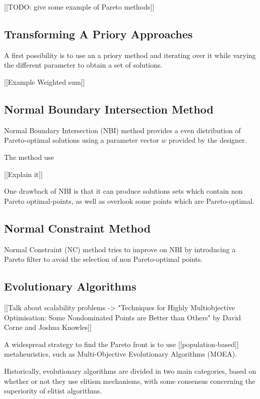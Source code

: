 [[TODO: give some example of Pareto methods]]

\subsection{Transforming A Priory Approaches}

A first possibility is to use an a priory method and iterating over it while varying the different parameter to obtain a set of solutions.

[[Example Weighted sum]]

\subsection{Normal Boundary Intersection Method}

Normal Boundary Intersection (NBI)\cite{S1052623496307510} method provides a even distribution of Pareto-optimal solutions using a parameter vector $w$ provided by the designer.

The method use 

[[Explain it]]

One drawback of NBI is that it can produce solutions sets which contain non Pareto optimal-points, as well as overlook some points which are Pareto-optimal.

\subsection{Normal Constraint Method}

Normal Constraint (NC) method tries to improve on NBI by introducing a Pareto filter to avoid the selection of non Pareto-optimal points.

\subsection{Evolutionary Algorithms}

[[Talk about scalability problems -> "Techniques for Highly Multiobjective Optimisation: Some Nondominated Points are Better than Others" by David Corne and Joshua Knowles]]


A widespread strategy to find the Pareto front is to use [[population-based]] metaheuristics, such as Multi-Objective Evolutionary Algorithms (MOEA). 

Historically, evolutionary algorithms are divided in two main categories, based on whether or not they use elitism mechanisms, with some consensus concerning the superiority of elitist algorithms.

